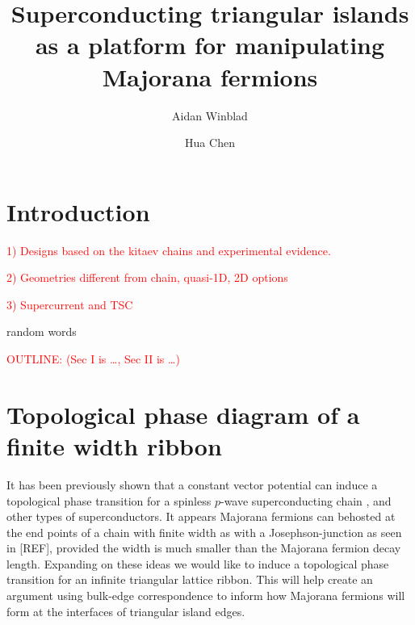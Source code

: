 \documentclass[aps,prb,showpacs,amsmath,amssymb,superscriptaddress]{revtex4-2}
\newcommand{\Red}[1]{\textcolor{red}{#1}}
\begin{document}
\title{Superconducting triangular islands as a platform for manipulating Majorana fermions}

\author{Aidan Winblad}

\author{Hua Chen}

\maketitle



\section{Introduction}
\Red{1) Designs based on the kitaev chains and experimental evidence.}

\Red{2) Geometries different from chain, quasi-1D, 2D options}

\Red{3) Supercurrent and TSC}

random words

\Red{OUTLINE: (Sec I is \dots, Sec II is \dots)}
\section{Topological phase diagram of a finite width ribbon}

It has been previously shown that a constant vector potential can induce a topological phase transition for a spinless $p$-wave superconducting chain \cite{takasanSupercurrentinducedTopologicalPhase2022}, and other types of superconductors.
It appears Majorana fermions can behosted at the end points of a chain with finite width as with a Josephson-junction as seen in [REF], provided the width is much smaller than the Majorana fermion decay length.
Expanding on these ideas we would like to induce a topological phase transition for an infinite triangular lattice ribbon.
This will help create an argument using bulk-edge correspondence to inform how Majorana fermions will form at the interfaces of triangular island edges.
\end{document}
